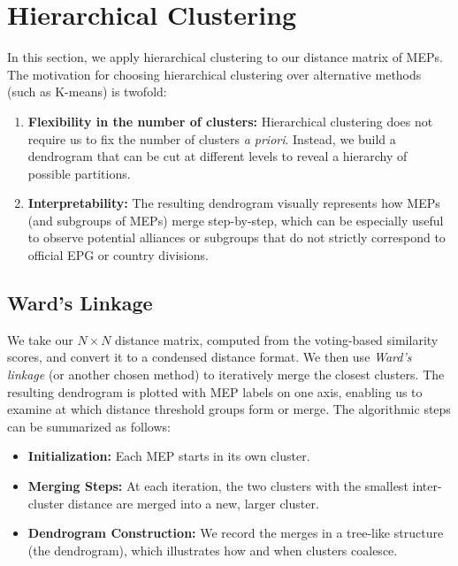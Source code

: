 \documentclass{article}
\begin{document}
\section{Hierarchical Clustering}

In this section, we apply hierarchical clustering to our distance matrix of MEPs. The motivation for choosing hierarchical clustering over alternative methods (such as K-means) is twofold: 
\begin{enumerate}
    \item \textbf{Flexibility in the number of clusters:} Hierarchical clustering does not require us to fix the number of clusters \emph{a priori}. Instead, we build a dendrogram that can be cut at different levels to reveal a hierarchy of possible partitions.
    \item \textbf{Interpretability:} The resulting dendrogram visually represents how MEPs (and subgroups of MEPs) merge step-by-step, which can be especially useful to observe potential alliances or subgroups that do not strictly correspond to official EPG or country divisions.
\end{enumerate}

\subsection{Ward's Linkage}

We take our $N \times N$ distance matrix, computed from the voting-based similarity scores, and convert it to a condensed distance format. We then use \textit{Ward's linkage} (or another chosen method) to iteratively merge the closest clusters. The resulting dendrogram is plotted with MEP labels on one axis, enabling us to examine at which distance threshold groups form or merge. The algorithmic steps can be summarized as follows:

\begin{itemize}
    \item \textbf{Initialization:} Each MEP starts in its own cluster.
    \item \textbf{Merging Steps:} At each iteration, the two clusters with the smallest inter-cluster distance are merged into a new, larger cluster.
    \item \textbf{Dendrogram Construction:} We record the merges in a tree-like structure (the dendrogram), which illustrates how and when clusters coalesce.
\end{itemize}
\end{document}
